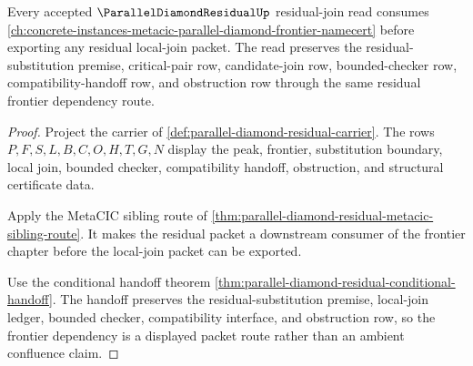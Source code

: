 \begin{theorem}
\label{thm:parallel-diamond-residual-frontier-dependency}
Every accepted $\ParallelDiamondResidualUp$ residual-join read consumes \autoref{ch:concrete-instances-metacic-parallel-diamond-frontier-namecert} before exporting any residual local-join packet. The read preserves the residual-substitution premise, critical-pair row, candidate-join row, bounded-checker row, compatibility-handoff row, and obstruction row through the same residual frontier dependency route.
\end{theorem}
\begin{proof}
Project the carrier of \autoref{def:parallel-diamond-residual-carrier}. The rows $P,F,S,L,B,C,O,H,T,G,N$ display the peak, frontier, substitution boundary, local join, bounded checker, compatibility handoff, obstruction, and structural certificate data.

Apply the MetaCIC sibling route of \autoref{thm:parallel-diamond-residual-metacic-sibling-route}. It makes the residual packet a downstream consumer of the frontier chapter before the local-join packet can be exported.

Use the conditional handoff theorem \autoref{thm:parallel-diamond-residual-conditional-handoff}. The handoff preserves the residual-substitution premise, local-join ledger, bounded checker, compatibility interface, and obstruction row, so the frontier dependency is a displayed packet route rather than an ambient confluence claim.
\end{proof}
